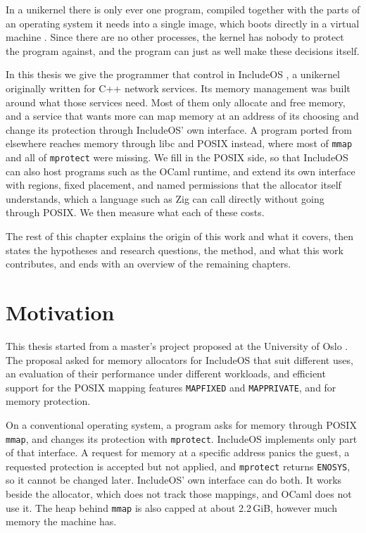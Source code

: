 \documentclass[12pt]{report}
\renewcommand{\_}{\origunderscore\allowbreak}
\begin{document}
In a unikernel there is only ever one program, compiled together with the parts of an operating system it needs into a single image, which boots directly in a virtual machine \cite{madhavapeddy2013unikernels}. Since there are no other processes, the kernel has nobody to protect the program against, and the program can just as well make these decisions itself.

In this thesis we give the programmer that control in IncludeOS \cite{bratterud2015includeos}, a unikernel originally written for C++ network services. Its memory management was built around what those services need. Most of them only allocate and free memory, and a service that wants more can map memory at an address of its choosing and change its protection through IncludeOS' own interface. A program ported from elsewhere reaches memory through libc and POSIX instead, where most of \texttt{mmap} and all of \texttt{mprotect} were missing. We fill in the POSIX side, so that IncludeOS can also host programs such as the OCaml runtime, and extend its own interface with regions, fixed placement, and named permissions that the allocator itself understands, which a language such as Zig can call directly without going through POSIX. We then measure what each of these costs.

The rest of this chapter explains the origin of this work and what it covers, then states the hypotheses and research questions, the method, and what this work contributes, and ends with an overview of the remaining chapters.

\section{Motivation}
\label{sec:motivation}

This thesis started from a master's project proposed at the University of Oslo \cite{uio-includeos-allocator}. The proposal asked for memory allocators for IncludeOS that suit different uses, an evaluation of their performance under different workloads, and efficient support for the POSIX mapping features \texttt{MAP\_FIXED} and \texttt{MAP\_PRIVATE}, and for memory protection.

On a conventional operating system, a program asks for memory through POSIX \texttt{mmap}, and changes its protection with \texttt{mprotect}. IncludeOS implements only part of that interface. A request for memory at a specific address panics the guest, a requested protection is accepted but not applied, and \texttt{mprotect} returns \texttt{ENOSYS}, so it cannot be changed later. IncludeOS' own interface can do both. It works beside the allocator, which does not track those mappings, and OCaml does not use it. The heap behind \texttt{mmap} is also capped at about 2.2\,GiB, however much memory the machine has.
\end{document}
